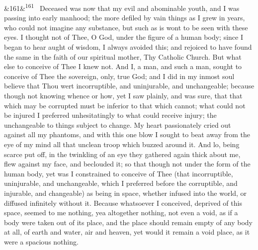 \documentclass[12pt]{article}
\newcommand{\para}[1][]{\par\noindent\ifx&#1&\else\textsuperscript{\footnotesize #1}~\fi}
\begin{document}
\para[161] Deceased was now that my evil and abominable youth, and I was passing into early manhood; the more defiled by vain things as I grew in years, who could not imagine any substance, but such as is wont to be seen with these eyes. I thought not of Thee, O God, under the figure of a human body; since I began to hear aught of wisdom, I always avoided this; and rejoiced to have found the same in the faith of our spiritual mother, Thy Catholic Church. But what else to conceive of Thee I knew not. And I, a man, and such a man, sought to conceive of Thee the sovereign, only, true God; and I did in my inmost soul believe that Thou wert incorruptible, and uninjurable, and unchangeable; because though not knowing whence or how, yet I saw plainly, and was sure, that that which may be corrupted must be inferior to that which cannot; what could not be injured I preferred unhesitatingly to what could receive injury; the unchangeable to things subject to change. My heart passionately cried out against all my phantoms, and with this one blow I sought to beat away from the eye of my mind all that unclean troop which buzzed around it. And lo, being scarce put off, in the twinkling of an eye they gathered again thick about me, flew against my face, and beclouded it; so that though not under the form of the human body, yet was I constrained to conceive of Thee (that incorruptible, uninjurable, and unchangeable, which I preferred before the corruptible, and injurable, and changeable) as being in space, whether infused into the world, or diffused infinitely without it. Because whatsoever I conceived, deprived of this space, seemed to me nothing, yea altogether nothing, not even a void, as if a body were taken out of its place, and the place should remain empty of any body at all, of earth and water, air and heaven, yet would it remain a void place, as it were a spacious nothing.
\end{document}
